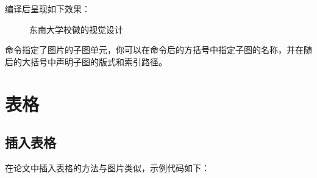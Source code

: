 \noindent 编译后呈现如下效果：

\begin{figure}[htbp]
  \centering
  \quad\quad
  \caption{东南大学校徽的视觉设计}
  \label{fig:4_4}
\end{figure}

命令指定了图片的子图单元，你可以在命令后的方括号中指定子图的名称，并在随后的大括号中声明子图的版式和索引路径。

\section{表格}

\subsection{插入表格}

在论文中插入表格的方法与图片类似，示例代码如下：

